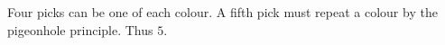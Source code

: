 Four picks can be one of each colour. A fifth pick must repeat a colour by the pigeonhole principle. Thus $\boxed5$.
